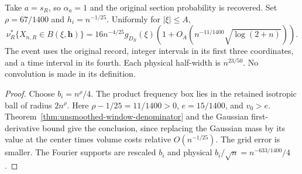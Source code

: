 \begin{corollary}
\label{cor:concrete-four-window}
Take $a=s_R$, so $\alpha_a=1$ and the original section probability
is recovered. Set $\rho=67/1400$ and $h_i=n^{-1/25}$.
Uniformly for $|\xi|\le A$,
\begin{equation}\label{eq:concrete-four-window}
 \nu_R^*\{X_{n,R}\in B(\xi,\mathbf h)\}
  =16n^{-4/25}g_{D_R}(\xi)
       \left(1+O_A(n^{-11/1400}\sqrt{\log(2+n)})\right).
\end{equation}
The event uses the original record, integer intervals in its first
three coordinates, and a time interval in its fourth. Each physical
half-width is $n^{23/50}$. No convolution is made in its definition.
\end{corollary}
\begin{proof}
Choose $b_i=n^\rho/4$. The product frequency box lies in the retained
isotropic ball of radius $2n^\rho$. Here
$\rho-1/25=11/1400>0$, $e=15/1400$, and $v_0>e$.
Theorem~\ref{thm:unsmoothed-window-denominator} and the Gaussian
first-derivative bound give the conclusion, since replacing the
Gaussian mass by its value at the center times volume costs relative
$O(n^{-1/25})$. The grid error is smaller. The Fourier supports are
rescaled $b_i$ and physical $b_i/\sqrt n=n^{-633/1400}/4$.
\end{proof}

